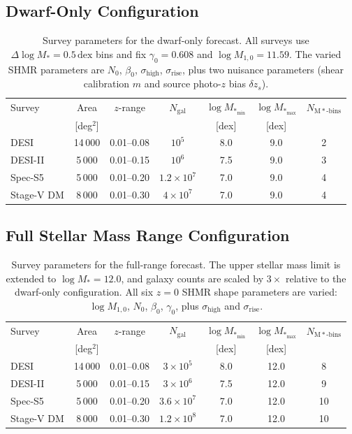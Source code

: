 \documentclass[12pt, letterpaper]{article}
\newcommand{\Mstar}{M_*}
\begin{document}
\subsection{Dwarf-Only Configuration}

\begin{table}[htbp]
\centering
\caption{Survey parameters for the dwarf-only forecast. All surveys
use $\Delta\log\Mstar = 0.5\,\mathrm{dex}$ bins and fix
$\gamma_0 = 0.608$ and $\log M_{1,0} = 11.59$. The varied SHMR
parameters are $N_0$, $\beta_0$, $\sigma_\mathrm{high}$,
$\sigma_\mathrm{rise}$, plus two nuisance parameters (shear
calibration $m$ and source photo-$z$ bias $\delta z_s$).}
\label{tab:surveys_dwarf}
\begin{tabular}{lcccccc}
\toprule
Survey & Area & $z$-range & $N_\mathrm{gal}$ &
$\log\Mstar_\mathrm{min}$ & $\log\Mstar_\mathrm{max}$ &
$N_\mathrm{M*\text{-bins}}$ \\
 & [deg$^2$] & & & [dex] & [dex] & \\
\midrule
DESI         & 14\,000 & 0.01--0.08 & $10^5$     & 8.0 & 9.0 & 2 \\
DESI-II      &  5\,000 & 0.01--0.15 & $10^6$     & 7.5 & 9.0 & 3 \\
Spec-S5      &  5\,000 & 0.01--0.20 & $1.2\times10^7$ & 7.0 & 9.0 & 4 \\
Stage-V DM   &  8\,000 & 0.01--0.30 & $4\times10^7$   & 7.0 & 9.0 & 4 \\
\bottomrule
\end{tabular}
\end{table}

\subsection{Full Stellar Mass Range Configuration}

\begin{table}[htbp]
\centering
\caption{Survey parameters for the full-range forecast. The upper
stellar mass limit is extended to $\log\Mstar = 12.0$, and galaxy
counts are scaled by $3\times$ relative to the dwarf-only
configuration. All six $z=0$ SHMR shape parameters are varied:
$\log M_{1,0}$, $N_0$, $\beta_0$, $\gamma_0$, plus
$\sigma_\mathrm{high}$ and $\sigma_\mathrm{rise}$.}
\label{tab:surveys_fullrange}
\begin{tabular}{lcccccc}
\toprule
Survey & Area & $z$-range & $N_\mathrm{gal}$ &
$\log\Mstar_\mathrm{min}$ & $\log\Mstar_\mathrm{max}$ &
$N_\mathrm{M*\text{-bins}}$ \\
 & [deg$^2$] & & & [dex] & [dex] & \\
\midrule
DESI         & 14\,000 & 0.01--0.08 & $3\times10^5$     & 8.0 & 12.0 & 8 \\
DESI-II      &  5\,000 & 0.01--0.15 & $3\times10^6$     & 7.5 & 12.0 & 9 \\
Spec-S5      &  5\,000 & 0.01--0.20 & $3.6\times10^7$   & 7.0 & 12.0 & 10 \\
Stage-V DM   &  8\,000 & 0.01--0.30 & $1.2\times10^8$   & 7.0 & 12.0 & 10 \\
\bottomrule
\end{tabular}
\end{table}
\end{document}
